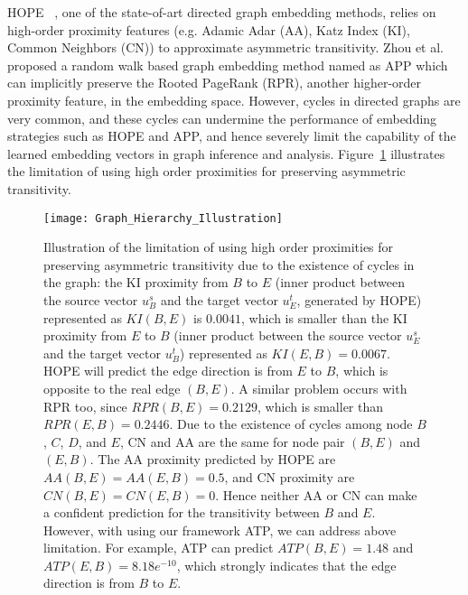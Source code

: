 \documentclass[letterpaper]{article} \usepackage{aaai19}  \usepackage{times}  \usepackage{helvet}  \usepackage{courier}  \usepackage{url}  \usepackage{graphicx}  \usepackage{booktabs} \usepackage{xcolor}
\begin{document}
HOPE ~\cite{Ou2016KDDAsymmetric}, one of the state-of-art directed graph embedding methods, relies on high-order proximity features (e.g. Adamic Adar (AA), Katz Index (KI), Common Neighbors (CN)) to approximate asymmetric transitivity. Zhou et al. ~\cite{Zhou2017ScalableGE} proposed a random walk based graph embedding method named as APP which can implicitly preserve the Rooted PageRank (RPR), another higher-order proximity feature,  in the embedding space.
However, cycles in directed graphs are very common, and these cycles can undermine the performance of embedding strategies such as HOPE and APP, and hence severely limit the capability of the learned embedding vectors in graph inference and analysis. Figure~\ref{fig:inferring_graph_hierarchy} illustrates the limitation of using high order proximities for preserving asymmetric transitivity. 


\begin{figure}[t!]
    \centering
    \texttt{[image: Graph\_Hierarchy\_Illustration]}\caption{\small Illustration of the limitation of using high order proximities for preserving asymmetric transitivity due to the existence of cycles in the graph: the KI proximity from $B$ to $E$ (inner product between the source vector $u_B^s$ and the target vector $u_E^t$, generated by HOPE) represented as $KI(B,E)$ is $0.0041$, which is smaller than the KI proximity from $E$ to $B$ (inner product between the source vector $u_E^s$ and the target vector $u_B^t$) represented as $KI(E,B) = 0.0067$. HOPE will predict the edge direction is from $E$ to $B$, which is opposite to the real edge $(B,E)$. A similar problem occurs with RPR too, since $RPR(B,E)=0.2129$, which is smaller than $RPR(E,B) = 0.2446$. Due to the existence of cycles among node $B$, $C$, $D$, and $E$, CN and AA are the same for node pair $(B,E)$ and $(E,B)$. The AA proximity predicted by HOPE are $AA(B,E) = AA(E,B) = 0.5$, and CN proximity are $CN(B,E) = CN(E,B) =0$. Hence neither AA or CN can make a confident prediction for the transitivity between $B$ and $E$. However, with using our framework ATP, we can address above limitation. For example, ATP can predict $ATP(B,E) = 1.48$ and $ATP(E,B) = 8.18e^{-10}$, which strongly indicates that the edge direction is from $B$ to $E$.}
    \label{fig:inferring_graph_hierarchy}
\end{figure}
\end{document}
